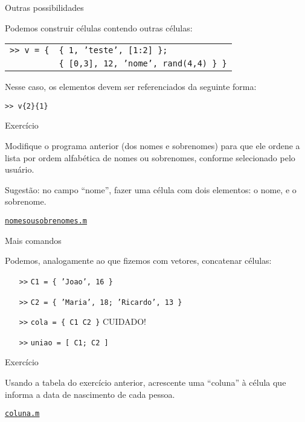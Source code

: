 \documentclass[hyperref={pdfpagelabels=false}]{beamer}
\begin{document}
\begin{frame}{Outras possibilidades}

  Podemos construir células contendo outras células:

  \begin{tabular}{r l}
    \texttt{>> v = \{} & \texttt{\alert{\{} 1, 'teste', [1:2] \alert{\}};}\\
    & \texttt{\alert{\{} [0,3], 12, 'nome', rand(4,4) \alert{\}} \}}
  \end{tabular}

  Nesse caso, os elementos devem ser referenciados da seguinte forma:

  \texttt{>> v\{2\}\{1\}}
\end{frame}

\begin{frame}{Exercício}

  Modifique o programa anterior (dos nomes e sobrenomes) para que ele ordene a lista por ordem alfabética de nomes ou sobrenomes, conforme selecionado pelo usuário.

  \vfill

  Sugestão: no campo ``nome'', fazer uma célula com dois elementos: o nome, e o sobrenome.

  \vfill

  \begin{center}
    \href{listings/nomesousobrenomes.m}{\underline{\texttt{nomesousobrenomes.m}}}
  \end{center}
  
\end{frame}

\begin{frame}{Mais comandos}

  Podemos, analogamente ao que fizemos com vetores, concatenar células:

  \begin{itemize}
  \item[\texttt{>>}] \texttt{C1 = \{ 'Joao', 16 \}}
  \item[\texttt{>>}] \texttt{C2 = \{ 'Maria', 18; 'Ricardo', 13 \}}
  \item[\texttt{>>}] \texttt{cola = \{ C1 C2 \}} \qquad \alert{CUIDADO!}
  \item[\texttt{>>}] \texttt{uniao = [ C1\alert{;} C2 ]}
  \end{itemize}
  
\end{frame}

\begin{frame}{Exercício}
  
  Usando a tabela do exercício anterior, acrescente uma ``coluna'' à célula que informa a data de nascimento de cada pessoa.

  \vfill

  \begin{center}
    \href{listings/coluna.m}{\underline{\texttt{coluna.m}}}
  \end{center}

\end{frame}
\end{document}
